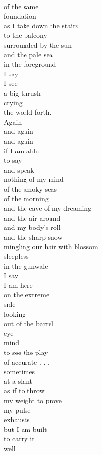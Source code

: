 \documentclass[smalldemyvopaper,11pt,twoside,onecolumn,openright,extrafontsizes]{memoir}
\begin{document}
\\of the same
\\foundation
\\as I take down the stairs
\\to the balcony
\\surrounded by the sun
\\and the pale sea
\\in the foreground
\\I say
\\I see
\\a big thrush
\\crying
\\the world forth.
\\Again
\\and again
\\and again
\\if I am able
\\to say
\\and speak
\\nothing of my mind
\\of the smoky seas
\\of the morning
\\and the cave of my dreaming
\\and the air around
\\and my body's roll
\\and the sharp snow
\\mingling our hair with blossom
\\sleepless
\\in the gunwale
\\I say
\\I am here
\\on the extreme
\\side
\\looking
\\out of the barrel
\\eye
\\mind
\\to see the play
\\of accurate . . .
\\sometimes
\\at a slant
\\as if to throw
\\my weight to prove
\\my pulse
\\exhausts
\\but I am built
\\to carry it
\\well
\end{document}
